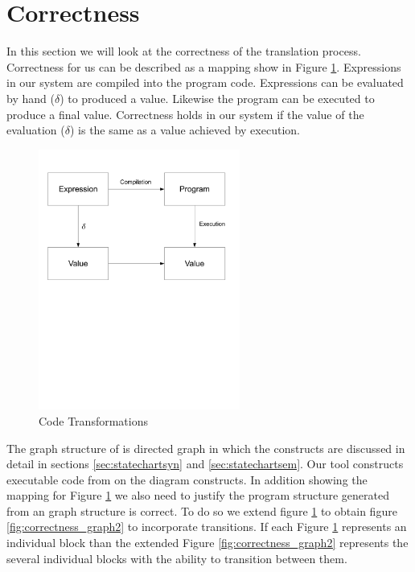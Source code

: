 \section{Correctness}

In this section we will look at the correctness of the translation process. Correctness for us can be described as a mapping show in Figure \ref{fig:correctness_graph1}. Expressions in our system are compiled into the program code. Expressions can be evaluated by hand ($\delta$) to produced a value. Likewise the program can be executed to produce a final value. Correctness holds in our system if the value of the evaluation ($\delta$) is the same as a value achieved by execution.

\begin{figure}[htb]
    \centering
    \includegraphics[trim= 10mm 120mm 10mm 10mm, clip, width=250px]{./images/correctness_graph1.pdf}
    \caption{Code Transformations}
    \label{fig:correctness_graph1}
\end{figure}

The graph structure of \plccharts is directed graph in which the constructs are discussed in detail in sections \ref{sec:statechartsyn} and \ref{sec:statechartsem}. Our tool constructs executable code from on the diagram constructs.  In addition showing the mapping for Figure \ref{fig:correctness_graph1} we also need to justify the program structure generated from an graph structure is correct. To do so we extend figure \ref{fig:correctness_graph1} to obtain figure \ref{fig:correctness_graph2} to incorporate transitions. If each Figure \ref{fig:correctness_graph1} represents an individual block than the extended Figure \ref{fig:correctness_graph2} represents the several individual blocks with the ability to transition between them.

